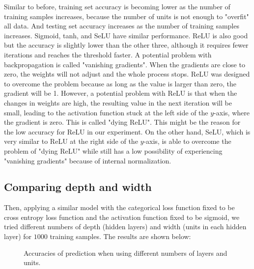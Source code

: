 \documentclass[UTF8,12pt]{article}
\begin{document}
	Similar to before, training set accuracy is becoming lower as the number of training samples increases, because the number of units is not enough to "overfit" all data. And testing set accuracy increases as the number of training samples increases. Sigmoid, tanh, and SeLU have similar performance. ReLU is also good but the accuracy is slightly lower than the other three, although it requires fewer iterations and reaches the threshold faster. A potential problem with backpropagation is called "vanishing gradients". When the gradients are close to zero, the weights will not adjust and the whole process stops. ReLU was designed to overcome the problem because as long as the value is larger than zero, the gradient will be 1. However, a potential problem with ReLU is that when the changes in weights are high, the resulting value in the next iteration will be small, leading to the activation function stuck at the left side of the $y$-axis, where the gradient is zero. This is called "dying ReLU". This might be the reason for the low accuracy for ReLU in our experiment. On the other hand, SeLU, which is very similar to ReLU at the right side of the $y$-axis, is able to overcome the problem of "dying ReLU" while still has a low possibility of experiencing "vanishing gradients" because of internal normalization.
	\subsection{Comparing depth and width}
	Then, applying a similar model with the categorical loss function fixed to be cross entropy loss function and the activation function fixed to be sigmoid, we tried different numbers of depth (hidden layers) and width (units in each hidden layer) for $1000$ training samples. The results are shown below:
	\begin{figure}[!ht]
		\centering
		\caption{\label{fig:model}Accuracies of prediction when using different numbers of layers and units.}
	\end{figure}
	
\end{document}
